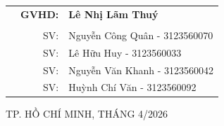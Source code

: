 \documentclass[a4paper]{article}
\begin{document}
\begin{titlepage}
  \vspace{2cm} %
  
  \begin{table}[h!]
    \begin{tabular}{rrl}
      \hspace{4cm} & \textbf{GVHD:} & \textbf{Lê Nhị Lãm Thuý}  \\ %
                   &                &                                 \\ %
                   & SV:          & Nguyễn Công Quân - 3123560070       \\
                   & SV:          & Lê Hữu Huy - 3123560033         \\
                   & SV:          & Nguyễn Văn Khanh - 3123560042       \\
                   & SV:          & Huỳnh Chí Văn - 3123560092       \\ 
    \end{tabular}
  \end{table}
  
  \vfill %
  
  \begin{center}
    {\footnotesize TP. HỒ CHÍ MINH, THÁNG 4/2026}
  \end{center}
  
\end{titlepage}



\thispagestyle{empty}
\newpage
\tableofcontents
\newpage
\end{document}
